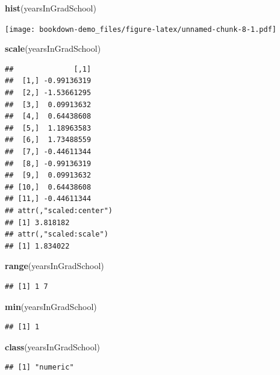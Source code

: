\documentclass[]{book}
\newenvironment{Shaded}{\begin{snugshade}}{\end{snugshade}}
\newcommand{\KeywordTok}[1]{\textcolor[rgb]{0.13,0.29,0.53}{\textbf{#1}}}
\newcommand{\NormalTok}[1]{#1}
\theoremstyle{definition}
\theoremstyle{definition}
\theoremstyle{definition}
\theoremstyle{remark}
\begin{document}
\begin{Shaded}
\begin{Highlighting}[]
\KeywordTok{hist}\NormalTok{(yearsInGradSchool)}
\end{Highlighting}
\end{Shaded}

\texttt{[image: bookdown-demo\_files/figure-latex/unnamed-chunk-8-1.pdf]}

\begin{Shaded}
\begin{Highlighting}[]
\KeywordTok{scale}\NormalTok{(yearsInGradSchool)}
\end{Highlighting}
\end{Shaded}

\begin{verbatim}
##              [,1]
##  [1,] -0.99136319
##  [2,] -1.53661295
##  [3,]  0.09913632
##  [4,]  0.64438608
##  [5,]  1.18963583
##  [6,]  1.73488559
##  [7,] -0.44611344
##  [8,] -0.99136319
##  [9,]  0.09913632
## [10,]  0.64438608
## [11,] -0.44611344
## attr(,"scaled:center")
## [1] 3.818182
## attr(,"scaled:scale")
## [1] 1.834022
\end{verbatim}

\begin{Shaded}
\begin{Highlighting}[]
\KeywordTok{range}\NormalTok{(yearsInGradSchool)}
\end{Highlighting}
\end{Shaded}

\begin{verbatim}
## [1] 1 7
\end{verbatim}

\begin{Shaded}
\begin{Highlighting}[]
\KeywordTok{min}\NormalTok{(yearsInGradSchool)}
\end{Highlighting}
\end{Shaded}

\begin{verbatim}
## [1] 1
\end{verbatim}

\begin{Shaded}
\begin{Highlighting}[]
\KeywordTok{class}\NormalTok{(yearsInGradSchool)}
\end{Highlighting}
\end{Shaded}

\begin{verbatim}
## [1] "numeric"
\end{verbatim}
\end{document}

